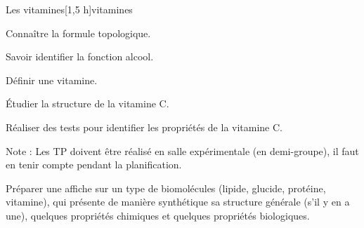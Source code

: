 \begin{multicols}{2}
  \begin{TP}{Les vitamines}[1,5 h]{vitamines}
    \begin{prerequis}
      \item Connaître la formule topologique.
      \item Savoir identifier la fonction alcool.
    \end{prerequis}
    \begin{objectifs}
      \item Définir une vitamine.
      \item Étudier la structure de la vitamine C.
      \item Réaliser des tests pour identifier les propriétés de la vitamine C.
    \end{objectifs}
  \end{TP}
\end{multicols}


Note :
Les TP doivent être réalisé en salle expérimentale (en demi-groupe), il faut en tenir compte pendant la planification.


\newpage
\nomPrenomClasse
{}
\vspace*{24pt}

\vspace*{-12.8 cm}

\begin{programmeSeance}
\end{programmeSeance}
\vspace*{1.2 cm}

\begin{programmeSeance}
\end{programmeSeance}
\vspace*{1.2 cm}

\begin{programmeSeance}[2]
\end{programmeSeance}


\begin{tacheFinale}
  Préparer une affiche  sur un type de biomolécules (lipide, glucide, protéine, vitamine), qui présente de manière synthétique sa structure générale  (s'il y en a une), quelques propriétés chimiques et quelques propriétés biologiques.
\end{tacheFinale}


